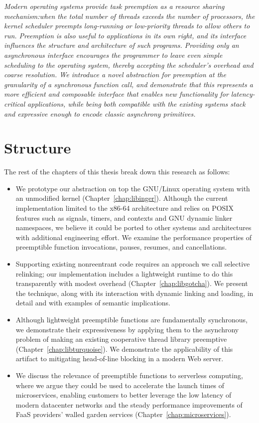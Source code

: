 \documentclass[12pt,letterpaper,openright]{report}
\begin{document}
\textit{Modern operating systems provide task preemption
as a resource sharing mechanism:\@ when the total number of
threads exceeds the number of processors, the kernel scheduler preempts long-running
or low-priority threads to allow others to run.  Preemption is also useful to
applications in its own right, and its interface
influences the structure and architecture of such programs.
Providing only an asynchronous interface encourages the programmer to leave even
simple scheduling to the operating system, thereby accepting the scheduler's overhead
and coarse resolution.  We introduce a novel
abstraction for preemption at the granularity of a synchronous function call, and
demonstrate that this represents a more efficient and composable interface that
enables new functionality for latency-critical applications, while being both
compatible with the existing systems stack and expressive enough
to encode classic asynchrony primitives.
}


\section{Structure}

The rest of the chapters of this thesis break down this research as follows:
\begin{itemize}
\item We prototype our abstraction on top the GNU/Linux operating system with an
	unmodified kernel (Chapter~\ref{chap:libinger}).  Although the current
	implementation limited to the x86-64 architecture and relies on POSIX
	features such as signals, timers, and contexts and GNU dynamic linker
	namespaces, we believe it could be ported to other systems and architectures
	with additional engineering effort.  We examine the performance properties of
	preemptible function invocations, pauses, resumes, and cancellations.
\item Supporting existing nonreentrant code requires an approach we call selective
	relinking; our implementation includes a lightweight runtime to do this
	transparently with modest overhead (Chapter~\ref{chap:libgotcha}).  We
	present the technique, along with its interaction with dynamic linking and
	loading, in detail and with examples of semantic implications.
\item Although lightweight preemptible functions are fundamentally synchronous, we
	demonstrate their expressiveness by applying them to the asynchrony problem
	of making an existing cooperative thread library preemptive
	(Chapter~\ref{chap:libturquoise}).  We demonstrate the applicability of this
	artifact to mitigating head-of-line blocking in a modern Web server.
\item We discuss the relevance of preemptible functions to serverless computing,
	where we argue they could be used to accelerate the launch times of
	microservices, enabling customers to better leverage the low latency of
	modern datacenter networks and the steady performance improvements of FaaS
	providers' walled garden services (Chapter~\ref{chap:microservices}).
\end{itemize}
\end{document}
